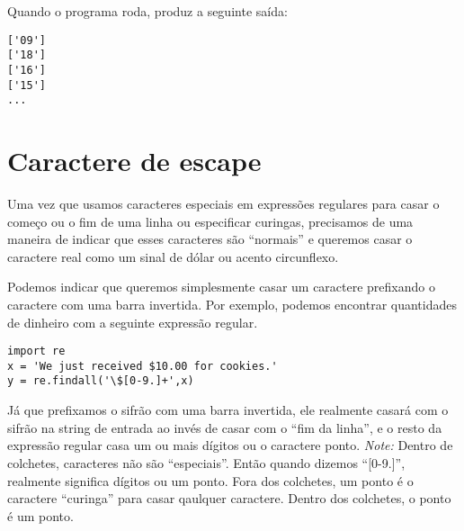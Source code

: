 Quando o programa roda, produz a seguinte saída:

\beforeverb
\begin{verbatim}
['09']
['18']
['16']
['15']
...
\end{verbatim}
\afterverb
%

\section{Caractere de escape}

Uma vez que usamos caracteres especiais em expressões regulares para casar o começo ou o fim 
de uma linha ou especificar curingas, precisamos de uma maneira de indicar que esses caracteres 
são ``normais'' e queremos casar o caractere real como um sinal de dólar ou acento circunflexo.

Podemos indicar que queremos simplesmente casar um caractere prefixando o caractere 
com uma barra invertida. Por exemplo, podemos encontrar quantidades de dinheiro com 
a seguinte expressão regular.

\beforeverb
\begin{verbatim}
import re
x = 'We just received $10.00 for cookies.'
y = re.findall('\$[0-9.]+',x)
\end{verbatim}
\afterverb
%

Já que prefixamos o sifrão com uma barra invertida, ele realmente casará com o sifrão 
na string de entrada ao invés de casar com o ``fim da linha'', e o resto da expressão 
regular casa um ou mais dígitos ou o caractere ponto. {\em Note:} Dentro de colchetes, 
caracteres não são ``especiais''. Então quando dizemos ``[0-9.]'', realmente significa 
dígitos ou um ponto. Fora dos colchetes, um ponto é o caractere ``curinga'' para casar 
qaulquer caractere. Dentro dos colchetes, o ponto é um ponto.

